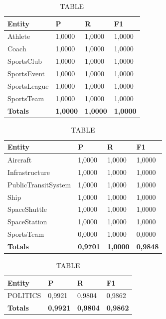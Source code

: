\documentclass[thesis=M,english]{FITthesis}[2018/05/30]
\begin{document}
	\begin{table}[H]\centering
		\caption{TABLE}
		\label{}
		\begin{tabular}{|l|l|l|l|}
			\hline {\textbf{Entity}} & {\textbf{P}} & {\textbf{R}} & {\textbf{F1}}\\\hline
				Athlete & 1,0000 & 1,0000 & 1,0000\\
				Coach & 1,0000 & 1,0000 & 1,0000\\
				SportsClub & 1,0000 & 1,0000 & 1,0000\\
				SportsEvent & 1,0000 & 1,0000 & 1,0000\\
				SportsLeague & 1,0000 & 1,0000 & 1,0000\\
				SportsTeam & 1,0000 & 1,0000 & 1,0000\\\hline
				\textbf{Totals} & \textbf{1,0000} & \textbf{1,0000} & \textbf{1,0000}\\\hline
		\end{tabular}
	\end{table}	

	\begin{table}[H]\centering
		\caption{TABLE}
		\label{}
		\begin{tabular}{|l|l|l|l|}
			\hline {\textbf{Entity}} & {\textbf{P}} & {\textbf{R}} & {\textbf{F1}}\\\hline
				Aircraft & 1,0000 & 1,0000 & 1,0000\\
				Infrastructure & 1,0000 & 1,0000 & 1,0000\\
				PublicTransitSystem & 1,0000 & 1,0000 & 1,0000\\
				Ship & 1,0000 & 1,0000 & 1,0000\\				
				SpaceShuttle & 1,0000 & 1,0000 & 1,0000\\
				SpaceStation & 1,0000 & 1,0000 & 1,0000\\
				SportsTeam & 0,0000 & 1,0000 & 0,0000\\\hline
				\textbf{Totals} & \textbf{0,9701} & \textbf{1,0000} & \textbf{0,9848}\\\hline
		\end{tabular}
	\end{table}	
	

	\begin{table}[H]\centering
		\caption{TABLE}
		\label{}
		\begin{tabular}{|l|l|l|l|}
			\hline {\textbf{Entity}} & {\textbf{P}} & {\textbf{R}} & {\textbf{F1}}\\\hline
				POLITICS & 0,9921 & 0,9804 & 0,9862\\\hline
				\textbf{Totals} & \textbf{0,9921} & \textbf{0,9804} & \textbf{0,9862}\\\hline
		\end{tabular}
	\end{table}
		
\end{document}
